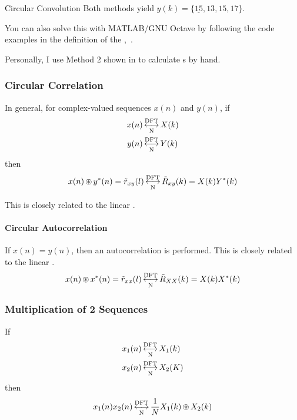 \begin{example}{Circular Convolution}
  Both methods yield $y(k) = \lbrace \underline{15}, 13, 15, 17 \rbrace$.

  \begin{remark*}
    You can also solve this with MATLAB/GNU Octave by following the code examples in the definition of the ,~.
  \end{remark*}
\end{example}

\begin{remark*}
  Personally, I use Method 2 shown in  to calculate s by hand.
\end{remark*}

\subsubsection{Circular Correlation}\label{subsubsec:DFT_Properties-Circular_Correlation}
In general, for complex-valued sequences $x(n)$ and $y(n)$, if
\begin{align*}
  x(n) &\operatorname{\overset{\text{DFT}}{\underset{N}{\longleftrightarrow}}} X(k) \\
  y(n) &\operatorname{\overset{\text{DFT}}{\underset{N}{\longleftrightarrow}}} Y(k)
\end{align*}
then
\begin{equation}\label{eq:DFT_Properties-Circular_Correlation}
  x(n) \operatorname{\circledast} y^{*}(n) = \tilde{r}_{xy}(l) \operatorname{\overset{\text{DFT}}{\underset{N}{\longleftrightarrow}}} \tilde{R}_{xy}(k) = X(k)Y^{*}(k)
\end{equation}
\begin{remark*}
  This is closely related to the linear .
\end{remark*}

\paragraph{Circular Autocorrelation}\label{par:DFT_Properties-Circular_Autocorrelation}
If $x(n) = y(n)$, then an autocorrelation is performed.
This is closely related to the linear .
\begin{equation}\label{eq:DFT_Properties-Circular_Autocorrelation}
  x(n) \operatorname{\circledast} x^{*}(n) = \tilde{r}_{xx}(l) \operatorname{\overset{\text{DFT}}{\underset{N}{\longleftrightarrow}}} \tilde{R}_{XX}(k) = X(k)X^{*}(k)
\end{equation}

\subsubsection{Multiplication of 2 Sequences}\label{subsubsec:DFT_Properties-2_Sequence_Multiplication}
If
\begin{align*}
  x_{1}(n) &\operatorname{\overset{\text{DFT}}{\underset{N}{\longleftrightarrow}}} X_{1}(k) \\
  x_{2}(n) &\operatorname{\overset{\text{DFT}}{\underset{N}{\longleftrightarrow}}} X_{2}(K)
\end{align*}
then
\begin{equation}\label{eq:2_Sequence_Multiplication}
  x_{1}(n)x_{2}(n) \operatorname{\overset{\text{DFT}}{\underset{N}{\longleftrightarrow}}} \frac{1}{N} X_{1}(k) \operatorname{\circledast} X_{2}(k)
\end{equation}

